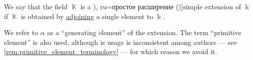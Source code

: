 \begin{definition}\label{def:simple_field_extension}
  We say that the field \( \BbbK \) is a \term[bg=просто разширение (\cite[def. VI.3]{ГеновМиховскиМоллов1991Алгебра}), ru=простое расширение (\cite[409]{Винберг2014КурсАлгебры})]{simple extension} of \( \Bbbk \) if \( \BbbK \) is obtained by \hyperref[def:field_adjunction]{adjoining} a single element to \( \Bbbk \).
\end{definition}
\begin{comments}
  \item We refer to \( \alpha \) as a \enquote{generating element} of the extension. The term \enquote{primitive element} is also used, although is usage is inconsistent among authors --- see \cref{rem:primitive_element_terminology} --- for which reason we avoid it.
\end{comments}

